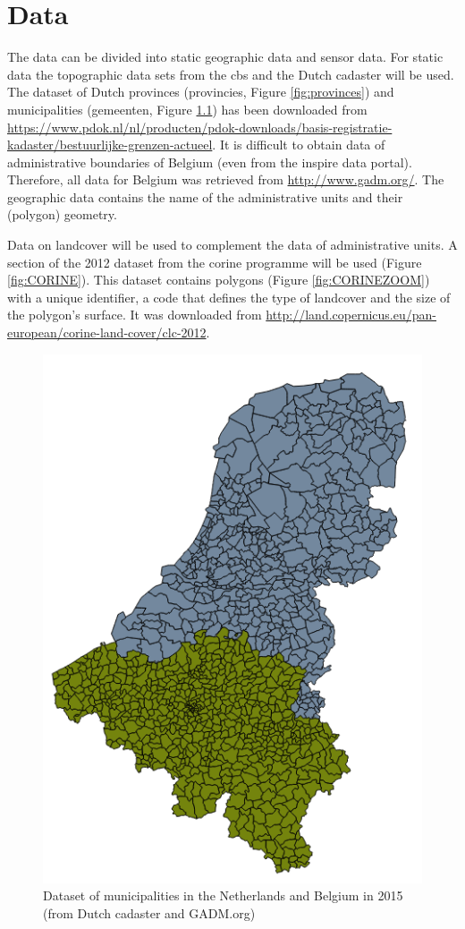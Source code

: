 
\chapter{Data}
\label{chap:data}

\begin{sloppypar}
	The data can be divided into static geographic data and sensor data. For static data the topographic data sets from the \ac{cbs} and the Dutch cadaster will be used. The dataset of Dutch provinces (provincies, Figure \ref{fig:provinces}) and municipalities (gemeenten, Figure \ref{fig:municipalities}) has been downloaded from \url{https://www.pdok.nl/nl/producten/pdok-downloads/basis-registratie-kadaster/bestuurlijke-grenzen-actueel}. It is difficult to obtain data of administrative boundaries of Belgium (even from the \ac{inspire} data portal). Therefore, all data for Belgium was retrieved from \url{http://www.gadm.org/}. The geographic data contains the name of the administrative units and their (polygon) geometry.
	
	Data on landcover will be used to complement the data of administrative units. A section of the 2012 dataset from the \ac{corine} programme will be used (Figure \ref{fig:CORINE}). This dataset contains polygons (Figure \ref{fig:CORINEZOOM}) with a unique identifier, a code that defines the type of landcover and the size of the polygon's surface. It was downloaded from \url{http://land.copernicus.eu/pan-european/corine-land-cover/clc-2012}. 
	
\end{sloppypar}

\begin{figure}
	\centering
	\includegraphics[width=0.5\linewidth]{figs/Municipalities.png}
	\caption{Dataset of municipalities in the Netherlands and Belgium in 2015 (from Dutch cadaster and GADM.org)}
	\label{fig:municipalities}
\end{figure}

